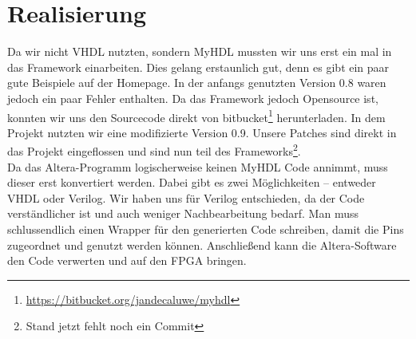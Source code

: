 \section{Realisierung}
Da wir nicht VHDL nutzten, sondern MyHDL mussten wir uns erst ein mal in das Framework einarbeiten. Dies gelang erstaunlich gut, denn es gibt ein paar gute Beispiele auf der Homepage. In der anfangs genutzten Version 0.8 waren jedoch ein paar Fehler enthalten. Da das Framework jedoch Opensource ist, konnten wir uns den Sourcecode direkt von bitbucket\footnote{\url{https://bitbucket.org/jandecaluwe/myhdl}} herunterladen. In dem Projekt nutzten wir eine modifizierte Version 0.9. Unsere Patches sind direkt in das Projekt eingeflossen und sind nun teil des Frameworks\footnote{Stand jetzt fehlt noch ein Commit}.\\
Da das Altera-Programm logischerweise keinen MyHDL Code annimmt, muss dieser erst konvertiert werden. Dabei gibt es zwei Möglichkeiten -- entweder VHDL oder Verilog. Wir haben uns für Verilog entschieden, da der Code verständlicher ist und auch weniger Nachbearbeitung bedarf. Man muss schlussendlich einen Wrapper für den generierten Code schreiben, damit die Pins zugeordnet und genutzt werden können. Anschließend kann die Altera-Software den Code verwerten und auf den FPGA bringen.